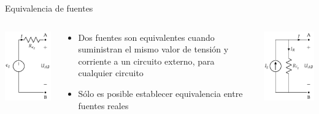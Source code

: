 \documentclass[aspectratio=169, xcolor={usenames,svgnames,dvipsnames}]{beamer}
\begin{document}
\begin{frame}{Equivalencia de fuentes}
    \begin{columns}
    \begin{column}{0.25\columnwidth}
        \begin{center}
        \includegraphics[height=0.5\textheight]{../figs/FuenteTensionRealDC.pdf}
        \end{center}
    \end{column}
    
    \begin{column}{0.48\columnwidth}
        \begin{itemize}
        \item Dos fuentes son equivalentes cuando suministran el mismo valor de tensión y corriente a un \alert{circuito externo}, para cualquier circuito

        \vspace{8mm}
        
        \item Sólo es posible establecer equivalencia entre \alert{fuentes reales}
        \end{itemize}
    \end{column}
    
    \begin{column}{0.25\columnwidth}
        \begin{center}
        \includegraphics[height=0.5\textheight]{../figs/FuenteCorrienteRealDC.pdf}
        \end{center}
    \end{column}
    \end{columns}
\end{frame}
\end{document}
